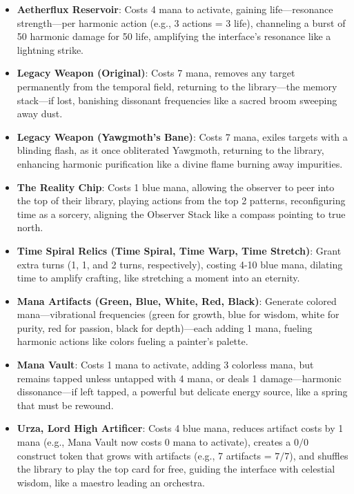 \begin{itemize}
\begin{itemize}
        \item \texttt{} \textbf{Aetherflux Reservoir}: Costs 4 mana to activate, gaining life—resonance strength—per harmonic action (e.g., 3 actions = 3 life), channeling a burst of 50 harmonic damage for 50 life, amplifying the interface's resonance like a lightning strike.
        \item \texttt{} \textbf{Legacy Weapon (Original)}: Costs 7 mana, removes any target permanently from the temporal field, returning to the library—the memory stack—if lost, banishing dissonant frequencies like a sacred broom sweeping away dust.
        \item \texttt{} \textbf{Legacy Weapon (Yawgmoth's Bane)}: Costs 7 mana, exiles targets with a blinding flash, as it once obliterated Yawgmoth, returning to the library, enhancing harmonic purification like a divine flame burning away impurities.
        \item \texttt{} \textbf{The Reality Chip}: Costs 1 blue mana, allowing the observer to peer into the top of their library, playing actions from the top 2 patterns, reconfiguring time as a sorcery, aligning the Observer Stack like a compass pointing to true north.
        \item \texttt{} \textbf{Time Spiral Relics (Time Spiral, Time Warp, Time Stretch)}: Grant extra turns (1, 1, and 2 turns, respectively), costing 4-10 blue mana, dilating time to amplify crafting, like stretching a moment into an eternity.
        \item \texttt{} \textbf{Mana Artifacts (Green, Blue, White, Red, Black)}: Generate colored mana—vibrational frequencies (green for growth, blue for wisdom, white for purity, red for passion, black for depth)—each adding 1 mana, fueling harmonic actions like colors fueling a painter's palette.
        \item \texttt{} \textbf{Mana Vault}: Costs 1 mana to activate, adding 3 colorless mana, but remains tapped unless untapped with 4 mana, or deals 1 damage—harmonic dissonance—if left tapped, a powerful but delicate energy source, like a spring that must be rewound.
        \item \texttt{} \textbf{Urza, Lord High Artificer}: Costs 4 blue mana, reduces artifact costs by 1 mana (e.g., Mana Vault now costs 0 mana to activate), creates a $0/0$ construct token that grows with artifacts (e.g., 7 artifacts = $7/7$), and shuffles the library to play the top card for free, guiding the interface with celestial wisdom, like a maestro leading an orchestra.

\end{itemize}
\end{itemize}
